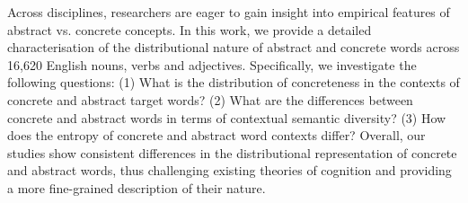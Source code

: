 Across disciplines, researchers are eager to gain insight into empirical features of abstract vs. concrete concepts. In this work, we provide a detailed characterisation of the distributional nature of abstract and concrete words across 16,620 English nouns, verbs and adjectives. Specifically, we investigate the following questions: (1) What is the distribution of concreteness in the contexts of concrete and abstract target words? (2) What are the differences between concrete and abstract words in terms of contextual semantic diversity? (3) How does the entropy of concrete and abstract word contexts differ? Overall, our studies show consistent differences in the distributional representation of concrete and abstract words, thus challenging existing theories of cognition and providing a more fine-grained description of their nature.

